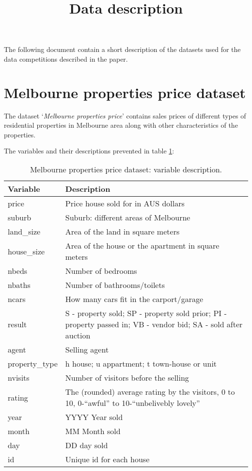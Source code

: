 \documentclass{article}
\begin{document}
\title{Data description}

\maketitle


The following document contain a short description of the datasets used for the data competitions described in the paper.

\section{Melbourne properties price dataset}

The dataset `\textit{Melbourne properties price}' contains sales prices of different types of residential properties in Melbourne area along with other characteristics of the properties. 

The variables and their descriptions prevented in table \ref{tab:Melb_price}:

\begin{table}[h]
	\begin{center}
		\renewcommand{\arraystretch}{1.1}
		\begin{tabular}{p{2cm} p{13cm}} \hline
			Variable   				& Description       \\\hline
			price 		& Price house sold for in AUS dollars\\
			suburb 		& Suburb: different areas of Melbourne\\
			land\_size  & Area of the land in square meters \\
			house\_size & Area of the house or the apartment in square meters\\
			nbeds 		& Number of bedrooms\\
			nbaths 		& Number of bathrooms/toilets\\
			ncars 		& How many cars fit in the carport/garage\\
			result 		& S - property sold; SP - property sold prior; PI - property passed in; VB - vendor bid; SA - sold after auction\\
			agent 		& Selling agent\\
			property\_type & h house; u appartment; t town-house or unit \\
			nvisits 	& Number of visitors before the selling\\
			rating 		& The (rounded) average rating by the visitors, 0 to 10, 0-``awful'' to 10-``unbelivebly lovely'' \\
			year 		& YYYY Year sold \\
			month 		& MM Month sold\\
			day 		& DD day sold\\
			id 			& Unique id for each house \\\hline
		
	\end{tabular}
	\caption{Melbourne properties price dataset: variable description.}
\end{center}
\label{tab:Melb_price}
\end{table}
\end{document}
